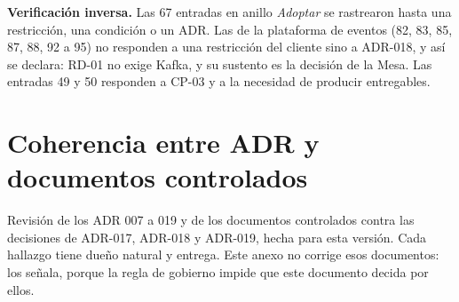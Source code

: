 \documentclass[11pt,a4paper]{article}
\begin{document}
\vspace{0.2cm}
\noindent\textbf{Verificación inversa.} Las 67 entradas en anillo \emph{Adoptar} se rastrearon hasta una restricción, una condición o un ADR. Las de la plataforma de eventos (82, 83, 85, 87, 88, 92 a 95) no responden a una restricción del cliente sino a ADR-018, y así se declara: RD-01 no exige Kafka, y su sustento es la decisión de la Mesa. Las entradas 49 y 50 responden a CP-03 y a la necesidad de producir entregables.

\section{Coherencia entre ADR y documentos controlados}
\label{anx:coherencia}

Revisión de los ADR 007 a 019 y de los documentos controlados contra las decisiones de ADR-017, ADR-018 y ADR-019, hecha para esta versión. Cada hallazgo tiene dueño natural y entrega. Este anexo no corrige esos documentos: los señala, porque la regla de gobierno impide que este documento decida por ellos.
\end{document}
